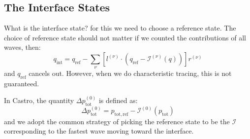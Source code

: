 \documentclass[12pt]{article}
\newcommand{\nup}{{(\nu)}}
\newcommand{\evz}{{(0)}}
\begin{document}
\subsection*{The Interface States}

What is the interface state? for this we need to choose a reference
state.  The choice of reference state should not matter if we counted
the contributions of all waves, then:
\begin{equation}
q_\mathrm{int} = q_\mathrm{ref} - \sum_\nu [ l^\nup \cdot (q_\mathrm{ref} - \mathcal{I}^\nup(q)) ] r^\nup
\end{equation}
and $q_\mathrm{ref}$ cancels out.  However, when we do characteristic
tracing, this is not guaranteed.

In Castro, the quantity $\Delta p^\evz_\mathrm{tot}$ is defined as:
\begin{equation}
\Delta p^\evz_\mathrm{tot} =
  p_\mathrm{tot,ref} - \mathcal{I}^\evz(p_\mathrm{tot})
\end{equation}
and we adopt the common strategy of picking the reference state to be
the $\mathcal{I}$ corresponding to the fastest wave moving toward the
interface.
\end{document}
